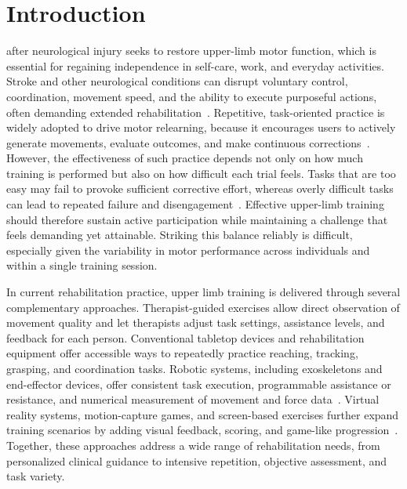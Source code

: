 \documentclass[journal,twoside,web]{ieeecolor2}
\begin{document}
\section{Introduction}
\label{sec:introduction}
 after neurological injury seeks to restore upper-limb motor function, which is essential for regaining independence in self-care, work, and everyday activities. Stroke and other neurological conditions can disrupt voluntary control, coordination, movement speed, and the ability to execute purposeful actions, often demanding extended rehabilitation~\cite{b1,b2}. Repetitive, task-oriented practice is widely adopted to drive motor relearning, because it encourages users to actively generate movements, evaluate outcomes, and make continuous corrections~\cite{b3,b4,b5}. However, the effectiveness of such practice depends not only on how much training is performed but also on how difficult each trial feels. Tasks that are too easy may fail to provoke sufficient corrective effort, whereas overly difficult tasks can lead to repeated failure and disengagement~\cite{b6,b7}. Effective upper-limb training should therefore sustain active participation while maintaining a challenge that feels demanding yet attainable. Striking this balance reliably is difficult, especially given the variability in motor performance across individuals and within a single training session.

In current rehabilitation practice, upper limb training is delivered through several complementary approaches. Therapist-guided exercises allow direct observation of movement quality and let therapists adjust task settings, assistance levels, and feedback for each person. Conventional tabletop devices and rehabilitation equipment offer accessible ways to repeatedly practice reaching, tracking, grasping, and coordination tasks. Robotic systems, including exoskeletons and end-effector devices, offer consistent task execution, programmable assistance or resistance, and numerical measurement of movement and force data~\cite{b8,b9,b10,b11,b12,b13}. Virtual reality systems, motion-capture games, and screen-based exercises further expand training scenarios by adding visual feedback, scoring, and game-like progression~\cite{b14,b15,b16}. Together, these approaches address a wide range of rehabilitation needs, from personalized clinical guidance to intensive repetition, objective assessment, and task variety.
\end{document}
